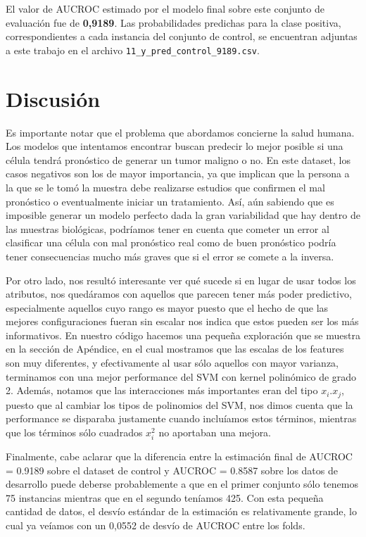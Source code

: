 \documentclass[10pt,a4paper]{article}
\begin{document}
El valor de AUCROC estimado por el modelo final sobre este conjunto de evaluación fue de \textbf{0,9189}. Las probabilidades predichas para la clase positiva, correspondientes a cada instancia del conjunto de control, se encuentran adjuntas a este trabajo en el archivo \texttt{11\_y\_pred\_control\_9189.csv}.

\section{Discusión}
Es importante notar que el problema que abordamos concierne la salud humana. Los modelos que intentamos encontrar buscan predecir lo mejor posible si una célula tendrá pronóstico de generar un tumor maligno o no. En este dataset, los casos negativos son los de mayor importancia, ya que implican que la persona a la que se le tomó la muestra debe realizarse estudios que confirmen el mal pronóstico o eventualmente iniciar un tratamiento. Así, aún sabiendo que es imposible generar un modelo perfecto dada la gran variabilidad que hay dentro de las muestras biológicas, podríamos tener en cuenta que cometer un error al clasificar una célula con mal pronóstico real como de buen pronóstico podría tener consecuencias mucho más graves que si el error se comete a la inversa. 

Por otro lado, nos resultó interesante ver qué sucede si en lugar de usar todos los atributos, nos quedáramos con aquellos que parecen tener más poder predictivo, 
especialmente aquellos cuyo rango es mayor puesto que el hecho de que las mejores configuraciones fueran sin escalar nos indica que estos pueden ser los más 
informativos. En nuestro código hacemos una pequeña exploración que se muestra en la sección de Apéndice, en el cual mostramos que las escalas de los features 
son muy diferentes, y efectivamente al usar sólo aquellos con mayor varianza, terminamos con una mejor performance del SVM con kernel polinómico de grado 2. 
Además, notamos que las interacciones más importantes eran del tipo $x_i . x_j$, puesto que al cambiar los tipos de polinomios del SVM, nos dimos cuenta que 
la performance se disparaba justamente cuando incluíamos estos términos, mientras que los términos sólo cuadrados $x_i^2$ no aportaban una mejora.

Finalmente, cabe aclarar que la diferencia entre la estimación final de AUCROC = 0.9189 sobre el dataset de control y AUCROC = 0.8587 sobre los datos de desarrollo puede deberse probablemente 
a que en el primer conjunto sólo tenemos 75 instancias mientras que en el segundo teníamos 425. Con esta pequeña cantidad de datos, el desvío estándar de la 
estimación es relativamente grande, lo cual ya veíamos con un 0,0552 de desvío de AUCROC entre los folds.
\end{document}
